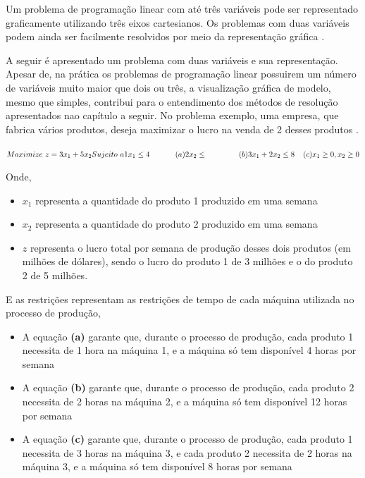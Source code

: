 Um problema de programação linear com até três variáveis pode ser representado graficamente utilizando três eixos cartesianos. Os problemas com duas variáveis podem ainda ser facilmente resolvidos por meio da representação gráfica \cite{Passos}. 

A seguir é apresentado um problema com duas variáveis e sua representação. Apesar de, na prática os problemas de programação linear possuirem um número de variáveis muito maior que dois ou três, a visualização gráfica de modelo, mesmo que simples, contribui para o entendimento dos métodos de resolução apresentados nao capítulo a seguir.
No problema exemplo, uma empresa, que fabrica vários produtos, deseja maximizar o lucro na venda de 2 desses produtos \cite{Hillier}.

$\\
Maximize\ z=3x_{1}+5x_{2}\\
Sujeito\ a \\
        1x_{1}\leq 4 \; \; \; \; \; \; \; \; \; \; \; \;(a)\\
        2x_{2}\leq \; \; \; \; \; \; \; \; \; \; \; \; \; \; \;(b)\\
        3x_{1}+2x_{2}\leq 8 \; \; \; \; (c)\\
        x_{1}\geq 0, x_{2}\geq 0 $

Onde, 
\begin{itemize}
\item \textbf {$x_{1}$} representa a quantidade do produto 1 produzido em uma semana
\item \textbf {$x_{2}$} representa a quantidade do produto 2 produzido em uma semana
\item \textbf {$z$} representa o lucro total por semana de produção desses dois produtos (em milhões de dólares), sendo o lucro do produto 1 de 3 milhões e o do produto 2 de 5 milhões.
\end{itemize}

E as restrições representam as restrições de tempo de cada máquina utilizada no processo de produção,
\begin{itemize}
\item A equação \textbf {(a)} garante que, durante o processo de produção, cada produto 1 necessita de 1 hora na máquina 1, e a máquina só tem disponível 4 horas por semana
\item A equação \textbf {(b)} garante que, durante o processo de produção, cada produto 2 necessita de 2 horas na máquina 2, e a máquina só tem disponível 12 horas por semana
\item A equação \textbf {(c)} garante que, durante o processo de produção, cada produto 1 necessita de 3 horas na máquina 3, e cada produto 2 necessita de 2 horas na máquina 3, e a máquina só tem disponível 8 horas por semana
\end{itemize}

